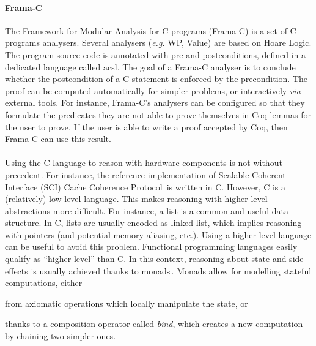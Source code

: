 \paragraph{Frama-C}
%
The Framework for Modular Analysis for C programs (Frama-C) is a set of C
programs analysers.
%
Several analysers (\emph{e.g.} WP, Value) are based on Hoare Logic.
%
The program source code is annotated with pre and postconditions, defined in a
dedicated language called \ac{acsl}.
%
The goal of a Frama-C analyser is to conclude whether the postcondition of a C
statement is enforced by the precondition.
%
The proof can be computed automatically for simpler problems, or interactively
\emph{via} external tools.
%
For instance, Frama-C's analysers can be configured so that they formulate the
predicates they are not able to prove themselves in Coq lemmas for the user to
prove.
%
If the user is able to write a proof accepted by Coq, then Frama-C can use this
result.

\paragraph{}
%
Using the C language to reason with hardware components is not without
precedent.
%
For instance, the reference implementation of Scalable Coherent Interface (SCI)
Cache Coherence Protocol\,\cite{stern1995cachecoherence} is written in C.
%
However, C is a (relatively) low-level language.
%
This makes reasoning with higher-level abstractions more difficult.
%
For instance, a list is a common and useful data structure.
%
In C, lists are usually encoded as linked list, which implies reasoning with
pointers (and potential memory aliasing, etc.).
%
Using a higher-level language can be useful to avoid this problem.
%
Functional programming languages easily qualify as ``higher level'' than C.
%
In this context, reasoning about state and side effects is usually achieved
thanks to monads\,\cite{jones2005io}.
%
Monads allow for modelling stateful computations, either \begin{inparaenum}[(1)]
%
\item from axiomatic operations which locally manipulate the state, or
%
\item thanks to a composition operator called \emph{bind}, which creates a new
  computation by chaining two simpler ones.
%
\end{inparaenum}

